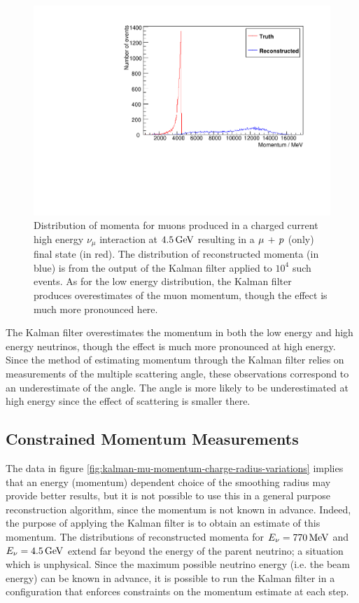 \begin{figure}
\centering
\includegraphics[angle=-90,width=\textwidth]{chapters/trackfitting_images/kalman-ccqe-high}
\caption[True and reconstructed muon momentum distributions at $4.5\GeV$]{\label{fig:kalman-ccqe-high}Distribution of momenta for muons produced in a charged current high energy $\nu_\mu$ interaction at $4.5\GeV$ resulting in a $\mu\,+\,p$ (only) final state (in red). The distribution of reconstructed momenta (in blue) is from the output of the Kalman filter applied to $10^4$ such events. As for the low energy distribution, the Kalman filter produces overestimates of the muon momentum, though the effect is much more pronounced here.}
\end{figure}

The Kalman filter overestimates the momentum in both the low energy and high energy neutrinos, though the effect is much more pronounced at high energy. Since the method of estimating momentum through the Kalman filter relies on measurements of the multiple scattering angle, these observations correspond to an underestimate of the angle. The angle is more likely to be underestimated at high energy since the effect of scattering is smaller there.

\subsection{Constrained Momentum Measurements}
The data in figure \ref{fig:kalman-mu-momentum-charge-radius-variations} implies that an energy (momentum) dependent choice of the smoothing radius may provide better results, but it is not possible to use this in a general purpose reconstruction algorithm, since the momentum is not known in advance. Indeed, the purpose of applying the Kalman filter is to obtain an estimate of this momentum. The distributions of reconstructed momenta for $E_\nu = 770\,\mathrm{MeV}$ and $E_\nu = 4.5\,\mathrm{GeV}$ extend far beyond the energy of the parent neutrino; a situation which is unphysical. Since the maximum possible neutrino energy (i.e. the beam energy) can be known in advance, it is possible to run the Kalman filter in a configuration that enforces constraints on the momentum estimate at each step.

